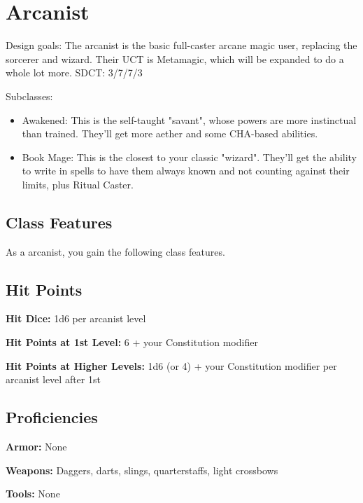 \section{Arcanist\label{class:arcanist}}

Design goals: The arcanist is the basic full-caster arcane magic user, replacing the sorcerer and wizard. Their UCT is Metamagic, which will be expanded to do a whole lot more. SDCT: 3/7/7/3

Subclasses:
\begin{itemize}
	\item Awakened: This is the self-taught "savant", whose powers are more instinctual than trained. They'll get more aether and some CHA-based abilities.
	\item Book Mage: This is the closest to your classic "wizard". They'll get the ability to write in spells to have them always known and not counting against their limits, plus Ritual Caster.
\end{itemize}

\subsection{Class Features}

As a arcanist, you gain the following class features.

\subsection{Hit Points}

\textbf{Hit Dice:} 1d6 per arcanist level

\textbf{Hit Points at 1st Level:} 6 + your Constitution modifier

\textbf{Hit Points at Higher Levels:} 1d6 (or 4) + your Constitution modifier per arcanist level after 1st

\subsection{Proficiencies}

\textbf{Armor:} None

\textbf{Weapons:} Daggers, darts, slings, quarterstaffs, light crossbows

\textbf{Tools:} None

